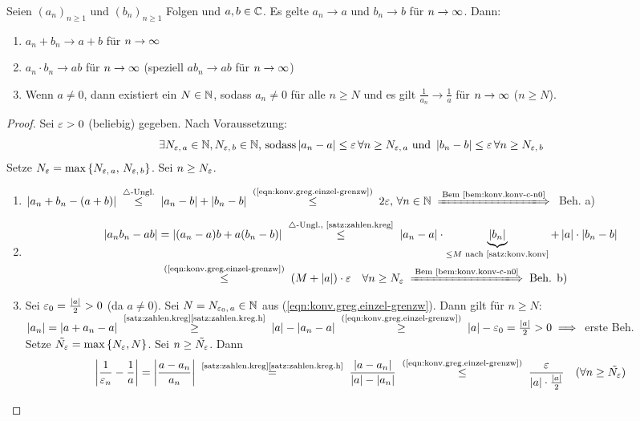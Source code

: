 \documentclass[12pt]{scrreprt}
\begin{document}
\begin{satz}
\label{satz:konv.greg}
Seien $(a_n)_{n\ge1}$ und $(b_n)_{n\ge1}$ Folgen und $a, b \in \mathbb{C}$. Es gelte $a_n \to a$ und $b_n \to b$ für $n\rightarrow\infty$. Dann:
\begin{enumerate}
\item $a_n+b_n \to a+b$ für $n\rightarrow\infty$ \label{satz:konv.greg.a}
\item $a_n \cdot b_n \to ab$ für $n\rightarrow\infty$ (speziell $ab_n \to ab$ für $n\rightarrow\infty$)\label{satz:konv.greg.b}
\item Wenn $a\ne0$, dann existiert ein $N\in\mathbb{N}$, sodass $a_n\ne0$ für alle $n \ge N$ und es gilt $\frac{1}{a_n}\to\frac{1}{a}$ für $n\rightarrow\infty$ ($n\ge N$). \label{satz:konv.greg.c}
\end{enumerate}
\end{satz}
\begin{proof}
Sei $\varepsilon>0$ (beliebig) gegeben. Nach Voraussetzung:
\begin{equation}\label{eqn:konv.greg.einzel-grenzw} \exists N_{\varepsilon,\,a}\in\mathbb{N}, N_{\varepsilon,\,b}\in\mathbb{N} \text{, sodass} \left\lvert a_n-a\right\lvert\le\varepsilon\,\forall n\ge N_{\varepsilon,\,a} \text{ und } \left\lvert b_n-b\right\lvert\le\varepsilon\,\forall n\ge N_{\varepsilon,\,b} \end{equation}
Setze $N_\varepsilon = \max{\{N_{\varepsilon,\,a},\,N_{\varepsilon,\,b}\}}$. Sei $n\ge N_\varepsilon$.
\begin{enumerate}
\item $\abs{a_n+b_n-(a+b)} \nach{\le}{$\triangle$-Ungl.} \abs{a_n-b}+\abs{b_n-b} \nach{\le}{(\ref{eqn:konv.greg.einzel-grenzw})} 2\ep,\,\forall \nat{n} \folgtnach{Bem~\ref{bem:konv.konv-c-n0}}$ Beh. a)
\item \begin{align*}
\abs{a_nb_n-ab} &=
\abs{(a_n-a)b+a(b_n-b)} \nach{\le}{$\triangle$-Ungl., \ref{satz:zahlen.kreg}}
\abs{a_n-a}\cdot\underbrace{\abs{b_n}}_{\le M \text{ nach \ref{satz:konv.konv}}}+\abs{a}\cdot\abs{b_n-b}\\
&\nach{\le}{(\ref{eqn:konv.greg.einzel-grenzw})} (M+\abs{a})\cdot\ep\quad\forall n\ge N_\ep \folgtnach{Bem~\ref{bem:konv.konv-c-n0}} \text{Beh. b)}
\end{align*}
\item Sei $\varepsilon_0=\frac{\left\lvert a\right\lvert}{2}>0$ (da $a\ne0$). Sei $N=N_{\varepsilon_0,\,a}\in\mathbb{N}$ aus (\ref{eqn:konv.greg.einzel-grenzw}). Dann gilt für $n\ge N$: $\abs{a_n}=\abs{a+a_n-a} \nach{\ge}{\ref{satz:zahlen.kreg}\ref{satz:zahlen.kreg.h}} \abs{a}-\abs{a_n-a} \nach{\ge}{(\ref{eqn:konv.greg.einzel-grenzw})} \abs{a}-\ep_0 = \frac{\abs{a}}{2} > 0 \folgt$ erste Beh.\\
Setze $\tilde{N_\varepsilon} = \max{\{N_\varepsilon, N\}}$. Sei $n\ge\tilde{N_\varepsilon}$. Dann
\[\abs{\frac{1}{\ep_n}-\frac{1}{a}} = \abs{\frac{a-a_n}{a_n}} \nach{=}{\ref{satz:zahlen.kreg}\ref{satz:zahlen.kreg.h}} \frac{\abs{a-a_n}}{\abs{a}-\abs{a_n}} \nach{\le}{(\ref{eqn:konv.greg.einzel-grenzw})} \frac{\ep}{\abs{a}\cdot\frac{\abs{a}}{2}} \quad(\forall n\ge\tilde{N_\ep})\]
\end{enumerate}
\end{proof}
\end{document}
